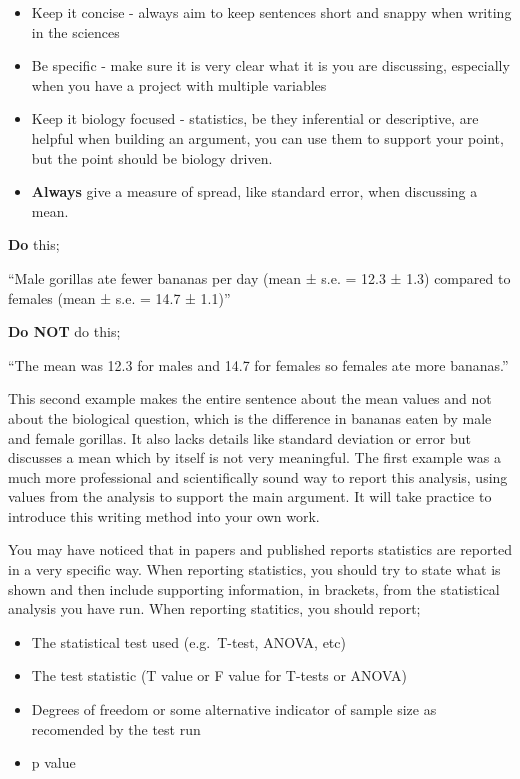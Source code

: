 \documentclass[
]{book}
\providecommand{\tightlist}{%
  \setlength{\itemsep}{0pt}\setlength{\parskip}{0pt}}
\begin{document}
\begin{itemize}
\tightlist
\item
  Keep it concise - always aim to keep sentences short and snappy when writing in the sciences
\item
  Be specific - make sure it is very clear what it is you are discussing, especially when you have a project with multiple variables
\item
  Keep it biology focused - statistics, be they inferential or descriptive, are helpful when building an argument, you can use them to support your point, but the point should be biology driven.
\item
  \textbf{Always} give a measure of spread, like standard error, when discussing a mean.
\end{itemize}

\textbf{Do} this;

``Male gorillas ate fewer bananas per day (mean ± s.e. = 12.3 ± 1.3) compared to females (mean ± s.e. = 14.7 ± 1.1)''

\textbf{Do NOT} do this;

``The mean was 12.3 for males and 14.7 for females so females ate more bananas.''

This second example makes the entire sentence about the mean values and not about the biological question, which is the difference in bananas eaten by male and female gorillas. It also lacks details like standard deviation or error but discusses a mean which by itself is not very meaningful. The first example was a much more professional and scientifically sound way to report this analysis, using values from the analysis to support the main argument. It will take practice to introduce this writing method into your own work.

You may have noticed that in papers and published reports statistics are reported in a very specific way. When reporting statistics, you should try to state what is shown and then include supporting information, in brackets, from the statistical analysis you have run. When reporting statitics, you should report;

\begin{itemize}
\tightlist
\item
  The statistical test used (e.g.~T-test, ANOVA, etc)
\item
  The test statistic (T value or F value for T-tests or ANOVA)
\item
  Degrees of freedom or some alternative indicator of sample size as recomended by the test run
\item
  p value
\end{itemize}
\end{document}

